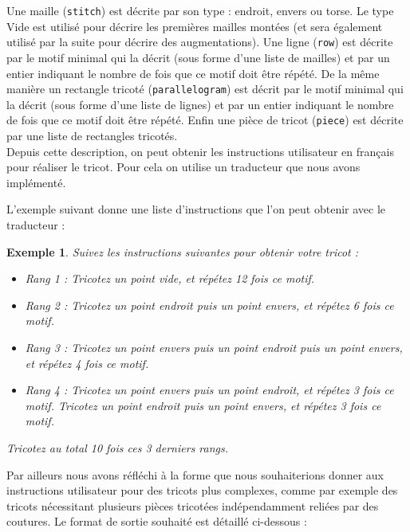 \documentclass{article}
\newtheorem{ex}{Exemple}
\begin{document}
Une maille (\texttt{stitch}) est décrite par son type : endroit, envers ou torse. Le type Vide est utilisé pour décrire les premières mailles montées (et sera également utilisé par la suite pour décrire des augmentations). Une ligne (\texttt{row}) est décrite par le motif minimal qui la décrit (sous forme d'une liste de mailles) et par un entier indiquant le nombre de fois que ce motif doit être répété. De la même manière un rectangle tricoté (\texttt{parallelogram}) est décrit par le motif minimal qui la décrit (sous forme d'une liste de lignes) et par un entier indiquant le nombre de fois que ce motif doit être répété. Enfin une pièce de tricot (\texttt{piece}) est décrite par une liste de rectangles tricotés. \\

Depuis cette description, on peut obtenir les instructions utilisateur en français pour réaliser le tricot. Pour cela on utilise un traducteur que nous avons implémenté.

L'exemple suivant donne une liste d'instructions que l'on peut obtenir avec le traducteur :

\begin{ex}
  Suivez les instructions suivantes pour obtenir votre tricot : 
  
  \begin{itemize}
  \item Rang 1 : Tricotez un point vide, et répétez 12 fois ce motif. 
  \item Rang 2 : Tricotez un point endroit puis un point envers, et répétez 6 fois ce motif. 
  \item Rang 3 : Tricotez un point envers puis un point endroit puis un point envers, et répétez 4 fois ce motif. 
  \item Rang 4 : Tricotez un point envers puis un point endroit, et répétez 3 fois ce motif. 
         Tricotez un point endroit puis un point envers, et répétez 3 fois ce motif. 
  \end{itemize}
Tricotez au total 10 fois ces 3 derniers rangs.
\end{ex}

Par ailleurs nous avons réfléchi à la forme que nous souhaiterions donner aux instructions utilisateur pour des tricots plus complexes, comme par exemple des tricots nécessitant plusieurs pièces tricotées indépendamment reliées par des coutures. Le format de sortie souhaité est détaillé ci-dessous :
\end{document}
